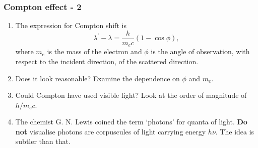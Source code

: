 \documentclass{beamer}
\begin{document}
\begin{frame}
\frametitle{Compton effect - 2}
\begin{enumerate}
\item The expression for Compton shift is
\begin{equation}\label{e10}
\lambda^\prime - \lambda = \frac{h}{m_ec}(1 - \cos\phi),
\end{equation}
where $m_e$ is the mass of the electron and $\phi$ is the angle of observation,
with respect to the incident direction, of the scattered direction.
\item Does it look reasonable? Examine the dependence on $\phi$ and $m_e$.
\item Could Compton have used visible light? Look at the order of magnitude
of $h/m_ec$.
\item The chemist G. N. Lewis coined the term `photons' for quanta of light.
\textbf{Do not} visualise photons are corpuscules of light carrying energy
$h\nu$. The idea is subtler than that.
\end{enumerate}
\end{frame}
\end{document}
